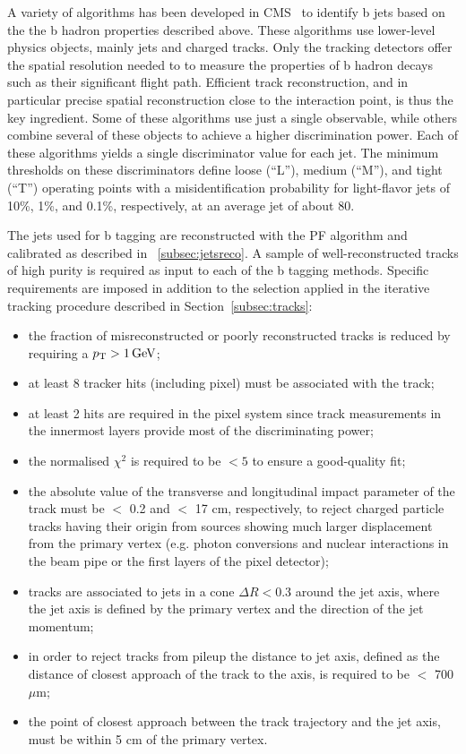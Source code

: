 A variety of algorithms has been developed in CMS~\cite{Chatrchyan:2012jua} to identify b jets based on the the b hadron properties described above. These algorithms use lower-level physics objects, mainly jets and charged tracks. Only the tracking detectors offer the spatial resolution needed to to measure the properties of b hadron decays such as their significant flight path. Efficient track reconstruction, and in particular precise spatial reconstruction close to the interaction point, is thus the key ingredient. 
Some of these algorithms use just a single observable, while others combine several of these objects to achieve a higher discrimination power. Each of these algorithms yields a single discriminator value for each jet. The minimum thresholds on these discriminators define loose (``L''), medium (``M''), and tight (``T'') operating points with a misidentification probability for light-flavor jets of 10\%, 1\%, and 0.1\%, respectively, at an average jet \pt of about 80\GeV.

The jets used for b tagging are reconstructed with the PF algorithm and calibrated as described in ~\ref{subsec:jetsreco}. A sample of well-reconstructed tracks of high purity is required as input to each of the b tagging methods. Specific requirements are imposed in addition to the selection applied in the iterative tracking procedure described in Section~\ref{subsec:tracks}:

\begin{itemize}
\item the fraction of misreconstructed or poorly reconstructed tracks is reduced by requiring a $p_{\mathrm{T}} >1\,\text{Ge\hspace{-.08em}V}$;
\item at least 8 tracker hits (including pixel) must be associated with the track;
\item at least 2 hits are required in the pixel system since track measurements in the innermost layers provide most of the discriminating power;
\item the normalised $\chi^2$ is required to be $< 5$ to ensure a good-quality fit;
\item the absolute value of the transverse and longitudinal impact parameter of the track must be $<$ 0.2 and $<$ 17 cm, respectively, to reject charged particle tracks having their origin from sources showing much larger displacement from the primary vertex (e.g. photon conversions and nuclear interactions in the beam pipe or the first layers of the pixel detector);
\item tracks are associated to jets in a cone $\Delta R < 0.3$ around the jet axis, where the jet axis is defined by the primary vertex and the direction of the jet momentum;
\item in order to reject tracks from pileup the distance to jet axis, defined as the distance of closest approach of the track to the axis, is required to be $<$ 700$\mu$m;
\item the point of closest approach between the track trajectory and the jet axis, must be within 5 cm of the primary vertex.
\end{itemize}

